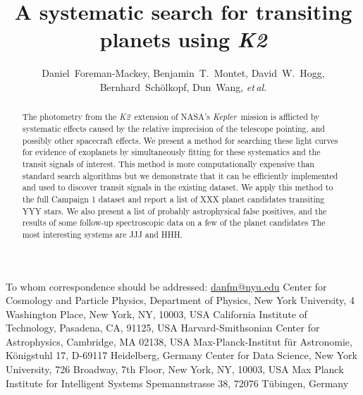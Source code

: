\documentclass[12pt,preprint]{aastex}
\newcommand{\project}[1]{\textsl{#1}} %
\newcommand{\kepler}{\project{Kepler}}
\newcommand{\KT}{\project{K2}}
\newcommand{\foreign}[1]{\emph{#1}}
\newcommand{\etal}{\foreign{et\,al.}}
\begin{document}
\title{%
    A systematic search for transiting planets using \KT
}

\newcommand{\nyu}{2}
\newcommand{\caltech}{3}
\newcommand{\cfa}{4}
\newcommand{\mpia}{5}
\newcommand{\cds}{6}
\newcommand{\mpis}{7}
\author{%
    Daniel~Foreman-Mackey\altaffilmark{1,\nyu},
    Benjamin~T.~Montet\altaffilmark{\caltech,\cfa},
    David~W.~Hogg\altaffilmark{\nyu,\mpia,\cds},
    Bernhard~Sch\"olkopf\altaffilmark{\mpis},
    Dun~Wang\altaffilmark{\nyu},
    \etal
}
         {To whom correspondence should be addressed:
                          \url{danfm@nyu.edu}}
\altaffiltext{\nyu}      {Center for Cosmology and Particle Physics,
                          Department of Physics, New York University,
                          4 Washington Place, New York, NY, 10003, USA}
\altaffiltext{\caltech}  {California Institute of Technology, Pasadena, CA,
                          91125, USA}
\altaffiltext{\cfa}      {Harvard-Smithsonian Center for Astrophysics,
                          Cambridge, MA 02138, USA}
\altaffiltext{\mpia}     {Max-Planck-Institut f\"ur Astronomie,
                          K\"onigstuhl 17, D-69117 Heidelberg, Germany}
\altaffiltext{\cds}      {Center for Data Science,
                          New York University,
                          726 Broadway, 7th Floor, New York, NY, 10003, USA}
\altaffiltext{\mpis}     {Max Planck Institute for Intelligent Systems
                          Spemannstrasse 38, 72076 T\"ubingen, Germany}

\begin{abstract}

The photometry from the \KT\ extension of NASA's \kepler\ mission is
afflicted by systematic effects caused by the relative imprecision of the
telescope pointing, and possibly other spacecraft effects.
We present a method for searching these light curves for evidence of
exoplanets by simultaneously fitting for these systematics and the
transit signals of interest.
This method is more computationally expensive than standard search algorithms
but we demonstrate that it can be efficiently implemented and used to
discover transit signals in the existing dataset.
We apply this method to the full Campaign 1 dataset and report a list of XXX
planet candidates transiting YYY stars.
We also present a list of probably astrophysical false positives, and
the results of some follow-up spectroscopic data on a few of the
planet candidates
The most interesting systems are JJJ and HHH.

\end{abstract}
\end{document}
